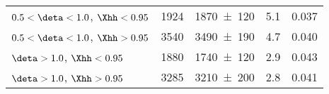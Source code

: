 \begin{table}[!tbh]
\begin{tabular}{lSSSS[table-format=4.4,table-number-alignment=center]}
$0.5<\deta<1.0$, $\Xhh<0.95$              & \num{1924}                     & \num{1870+-120}                        & \num{5.1}                             & 0.037   \\                               %
$0.5<\deta<1.0$, $\Xhh>0.95$              & \num{3540}                     & \num{3490+-190}                        & \num{4.7}                             & 0.040   \\                               %

$\deta>1.0$, $\Xhh<0.95$                  & \num{1880}                     & \num{1740+-120}                        & \num{2.9}                             & 0.043   \\                               %
$\deta>1.0$, $\Xhh>0.95$                  & \num{3285}                     & \num{3210+-200}                        & \num{2.8}                             & 0.041   \\                               %


\end{tabular}
\end{table}
